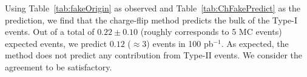Using Table~\ref{tab:fakeOrigin} as observed and Table~\ref{tab:ChFakePredict} as the 
prediction, we find that the charge-flip method predicts the bulk of the Type-I events.
Out of a total of $0.22 \pm 0.10$ (roughly corresponds to 5 MC events) expected events, we predict 
$0.12$ ($\approx 3$) events in 100 pb$^{-1}$. As expected,
the method does not predict any contribution from Type-II events. 
We consider the agreement to be satisfactory.

